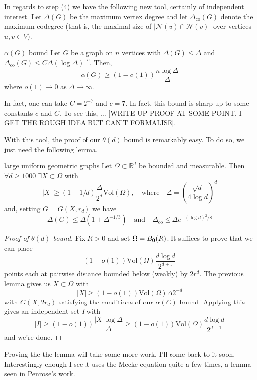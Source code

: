 \documentclass{article}
\begin{document}
In regards to step (4) we have the following new tool, certainly of independent interest. Let $\Delta(G)$ be the 
maximum vertex degree and let $\Delta_\text{co}(G)$ denote the maximum codegree (that is, the maximal size of 
$|\mathcal{N}(u)\cap \mathcal{N}(v)|$ over vertices $u, v \in V$). 

\begin{theorem}[]{$\alpha(G)$ bound}
    Let $G$ be a graph on $n$ vertices with $\Delta(G) \leq \Delta$ and $\Delta_\text{co}(G) \leq C\Delta (\log \Delta)^{-c}$. 
    Then, \[\alpha(G) \geq (1 - o(1))\frac{n \log \Delta}{\Delta}\] where $o(1) \to 0$ as $\Delta \to \infty$.
\end{theorem}

In fact, one can take $C = 2^{-7}$ and $c = 7$. In fact, this bound is sharp up to some constants $c$ and $C$. To see 
this, $\dots$ [WRITE UP PROOF AT SOME POINT, I GET THE ROUGH IDEA BUT CAN'T FORMALISE].

With this tool, the proof of our $\theta(d)$ bound is remarkably easy. To do so, we just need the following lemma. 

\begin{lemma}[]{large uniform geometric graphs}
    Let $\Omega \subset \mathbb{R}^d$ be bounded and measurable. Then $\forall d \geq 1000 \; \exists X \subset \Omega$ 
    with \[|X| \geq (1-1/d)\frac{\Delta}{2^d}\text{Vol}(\Omega), \quad \text{where} \quad \Delta = 
    \left(\frac{\sqrt{d}}{4\log d}\right)^d\] and, setting $G = G(X, r_d)$ we have 
    \[\Delta(G) \leq \Delta(1 + \Delta^{-1/3}) \quad \text{and} \quad \Delta_\text{co} \leq \Delta e^{-(\log d)^2/8}\]
\end{lemma}

\begin{proof}[Proof of $\theta(d)$ bound]
    Fix $R > 0$ and set $\Omega = B_{{\bf 0}}(R)$. It suffices to prove that we can place \[(1 - o(1))\text{Vol}(\Omega)
    \frac{d\log d}{2^{d+1}}\] points each at pairwise distance bounded below (weakly) by $2r^d$. The previous lemma 
    gives us $X \subset \Omega$ with \[|X| \geq (1-o(1))\text{Vol}(\Omega)\Delta 2^{-d}\] with $G(X, 2r_d)$ satisfying 
    the conditions of our $\alpha(G)$ bound. Applying this gives an independent set $I$ with \[|I| \geq (1-o(1))
    \frac{|X|\log \Delta}{\Delta} \geq (1-o(1))\text{Vol}(\Omega)\frac{d\log d}{2^{d+1}}\] and we're done.
\end{proof}

Proving the the lemma will take some more work. I'll come back to it soon. Interestingly enough I see it uses the 
Mecke equation quite a few times, a lemma seen in Penrose's work. 

\newpage


 
\end{document}
